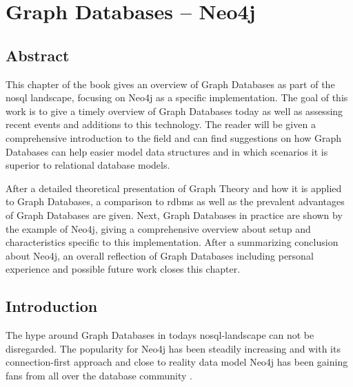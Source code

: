 
\chapter{Graph Databases -- Neo4j}
\section{Abstract}
This chapter of the book gives an overview of Graph Databases as part of the \gls{nosql} landscape, focusing on Neo4j as a specific implementation. The goal of this work is to give a timely overview of Graph Databases today as well as assessing recent events and additions to this technology. The reader will be given a comprehensive introduction to the field and can find suggestions on how Graph Databases can help easier model data structures and in which scenarios it is superior to relational database models.

After a detailed theoretical presentation of Graph Theory and how it is applied to Graph Databases, a comparison to \gls{rdbms} as well as the prevalent advantages of Graph Databases are given. Next, Graph Databases in practice are shown by the example of Neo4j, giving a comprehensive overview about setup and characteristics specific to this implementation. After a summarizing conclusion about Neo4j, an overall reflection of Graph Databases including personal experience and possible future work closes this chapter.


\section{Introduction}
The hype around Graph Databases in todays \gls{nosql}-landscape can not be disregarded. The popularity for Neo4j has been steadily increasing and with its connection-first approach and close to reality data model Neo4j has been gaining fans from all over the database community \autocite{neo4jmark}.

